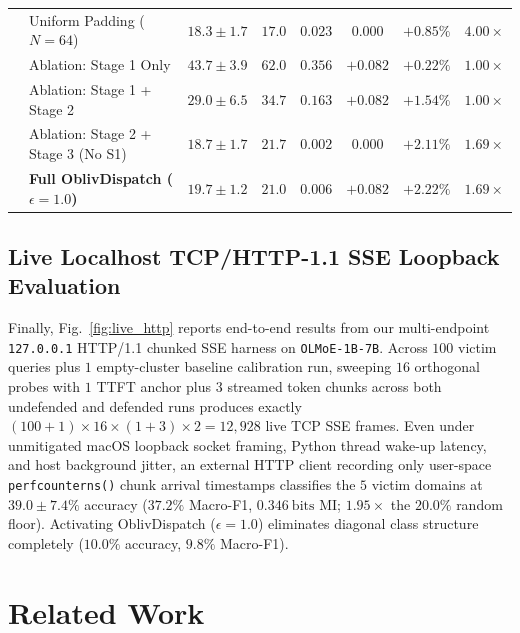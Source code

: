 \documentclass[11pt,a4paper]{article}
\renewcommand{\_}{\textunderscore\allowbreak}
\def\OD{OblivDispatch}%
\theoremstyle{definition}
\theoremstyle{remark}
\newcommand{\OD}{\textsc{OblivDispatch}}
\begin{document}
\begin{table}[htbp]
{\begin{tabular}{llcccccc}
      & Uniform Padding ($N=64$) & $18.3 \pm 1.7$ & $17.0$ & $0.023$ & $0.000$ & $+0.85\%$ & $4.00\times$ \\
      & Ablation: Stage 1 Only & $43.7 \pm 3.9$ & $62.0$ & $0.356$ & $+0.082$ & $+0.22\%$ & $1.00\times$ \\
      & Ablation: Stage 1 + Stage 2 & $29.0 \pm 6.5$ & $34.7$ & $0.163$ & $+0.082$ & $+1.54\%$ & $1.00\times$ \\
      & Ablation: Stage 2 + Stage 3 (No S1) & $\mathbf{18.7 \pm 1.7}$ & $\mathbf{21.7}$ & $\mathbf{0.002}$ & $\mathbf{0.000}$ & $+2.11\%$ & $\mathbf{1.69\times}$ \\
      & \textbf{Full \OD{} ($\epsilon = 1.0$)} & $\mathbf{19.7 \pm 1.2}$ & $\mathbf{21.0}$ & $\mathbf{0.006}$ & $\mathbf{+0.082}$ & $+2.22\%$ & $\mathbf{1.69\times}$ \\
    \bottomrule
  \end{tabular}%
  }
\end{table}

\subsection{Live Localhost TCP/HTTP-1.1 SSE Loopback Evaluation}
Finally, Fig.~\ref{fig:live_http} reports end-to-end results from our multi-endpoint \texttt{127.0.0.1} HTTP/1.1 chunked SSE harness on \texttt{OLMoE-1B-7B}. Across $100$ victim queries plus $1$ empty-cluster baseline calibration run, sweeping $16$ orthogonal probes with $1$ TTFT anchor plus $3$ streamed token chunks across both undefended and defended runs produces exactly $(100 + 1) \times 16 \times (1 + 3) \times 2 = 12{,}928$ live TCP SSE frames. Even under unmitigated macOS loopback socket framing, Python thread wake-up latency, and host background jitter, an external HTTP client recording only user-space \texttt{perf\_counter\_ns()} chunk arrival timestamps classifies the $5$ victim domains at $39.0 \pm 7.4\%$ accuracy ($37.2\%$ Macro-F1, $0.346~\mathrm{bits}$ MI; $1.95\times$ the $20.0\%$ random floor). Activating \OD{} ($\epsilon = 1.0$) eliminates diagonal class structure completely ($10.0\%$ accuracy, $9.8\%$ Macro-F1).

\section{Related Work}\label{sec:related}
\end{document}
